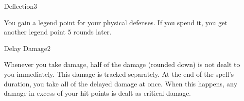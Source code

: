 \begin{spellsection}{Deflection}{3}
\begin{spellheader}
\end{spellheader}
\begin{spellcontent}
    \begin{spelltargetinginfo}
    \end{spelltargetinginfo}
    \begin{spelleffects}
        \spelleffect You gain a legend point for your physical defenses. If you spend it, you get another legend point 5 rounds later.
        \spelldur \durlong
    \end{spelleffects}
\end{spellcontent}
\begin{spellfooter}
\end{spellfooter}
\end{spellsection}

\begin{spellsection}{Delay Damage}{2}
\begin{spellheader}
\end{spellheader}
\begin{spellcontent}
    \begin{spelltargetinginfo}
    \end{spelltargetinginfo}
    \begin{spelleffects}
        \spelleffect Whenever you take damage, half of the damage (rounded down) is not dealt to you immediately. This damage is tracked separately. At the end of the spell's duration, you take all of the delayed damage at once. When this happens, any damage in excess of your hit points is dealt as critical damage.
        \spelldur \durmed
    \end{spelleffects}
\end{spellcontent}
\begin{spellfooter}
\end{spellfooter}
\end{spellsection}

